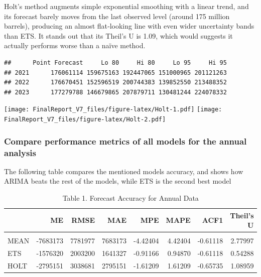 \documentclass[
]{article}
\begin{document}
Holt's method augments simple exponential smoothing with a linear trend,
and its forecast barely moves from the last observed level (around 175
million barrels), producing an almost flat‐looking line with even wider
uncertainty bands than ETS. It stands out that its Theil's U is 1.09,
which would suggests it actually performs worse than a naïve method.

\begin{verbatim}
##      Point Forecast     Lo 80     Hi 80     Lo 95     Hi 95
## 2021      176061114 159675163 192447065 151000965 201121263
## 2022      176670451 152596519 200744383 139852550 213488352
## 2023      177279788 146679865 207879711 130481244 224078332
\end{verbatim}

\texttt{[image: FinalReport\_V7\_files/figure-latex/Holt-1.pdf]}
\texttt{[image: FinalReport\_V7\_files/figure-latex/Holt-2.pdf]}

\subsubsection{Compare performance metrics of all models for the annual
analysis}\label{compare-performance-metrics-of-all-models-for-the-annual-analysis}

The following table compares the mentioned models accuracy, and shows
how ARIMA beats the rest of the models, while ETS is the second best
model

\begin{table}
\centering\centering
\caption{\label{tab:tablescores}Table 1. Forecast Accuracy for Annual Data}
\centering
\begin{tabular}[t]{l|r|r|r|r|r|r|r}
\hline
  & ME & RMSE & MAE & MPE & MAPE & ACF1 & Theil's U\\
\hline
\cellcolor{gray!10}{ARIMA} & \cellcolor{gray!10}{-1574422} & \cellcolor{gray!10}{2001707} & \cellcolor{gray!10}{1640694} & \cellcolor{gray!10}{-0.91057} & \cellcolor{gray!10}{0.94832} & \cellcolor{gray!10}{-0.61118} & \cellcolor{gray!10}{0.54238}\\
\hline
MEAN & -7683173 & 7781977 & 7683173 & -4.42404 & 4.42404 & -0.61118 & 2.77997\\
\hline
ETS & -1576320 & 2003200 & 1641327 & -0.91166 & 0.94870 & -0.61118 & 0.54288\\
\hline
HOLT & -2795151 & 3038681 & 2795151 & -1.61209 & 1.61209 & -0.65735 & 1.08959\\
\hline
\end{tabular}
\end{table}
\end{document}

